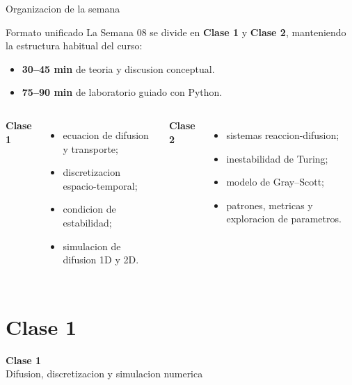 




\frame{\titlepage}

\begin{frame}{Organizacion de la semana}
\begin{block}{Formato unificado}
La Semana 08 se divide en \textbf{Clase 1} y \textbf{Clase 2}, manteniendo la estructura habitual del curso:
\begin{itemize}
    \item \textbf{30--45 min} de teoria y discusion conceptual.
    \item \textbf{75--90 min} de laboratorio guiado con Python.
\end{itemize}
\end{block}

\vspace{0.2cm}
\begin{columns}[T,onlytextwidth]
\textbf{Clase 1}
\begin{itemize}
    \item ecuacion de difusion y transporte;
    \item discretizacion espacio-temporal;
    \item condicion de estabilidad;
    \item simulacion de difusion 1D y 2D.
\end{itemize}

\textbf{Clase 2}
\begin{itemize}
    \item sistemas reaccion-difusion;
    \item inestabilidad de Turing;
    \item modelo de Gray--Scott;
    \item patrones, metricas y exploracion de parametros.
\end{itemize}
\end{columns}
\end{frame}

\section{Clase 1}

\begin{frame}[plain]
\centering
\vfill
{\Huge \bfseries Clase 1}\\[0.4cm]
{\Large Difusion, discretizacion y simulacion numerica}
\vfill
\end{frame}

